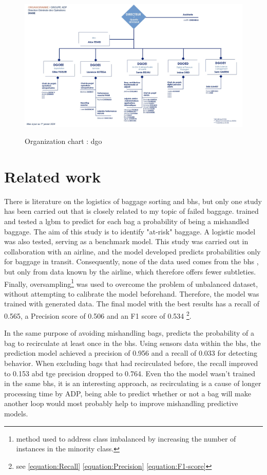 \documentclass[12pt]{article}
\begin{document}
\begin{figure}[h]
    \includegraphics[width=1\textwidth]{organigramme_DGO.jpg}\\
    \caption{Organization chart : \acrshort{dgo}}
\end{figure}
\FloatBarrier


\newpage
\section{Related work}

There is literature on the logistics of baggage sorting and \acrlong{bhs}, but only one study has been carried out that is closely related to my topic of failed baggage.
\cite{MishandledBgas} trained and tested a \acrlong{lgbm} to predict for each bag a probability of being a mishandled baggage. The aim of this study is to identify "at-risk" baggage. A logistic model was also tested, serving as a benchmark model. \hfill \break 
\noindent This study was carried out in collaboration with an airline, and the model developed predicts probabilities only for baggage in transit. Consequently, none of the data used comes from the \acrshort{bhs} , but only from data known by the airline, which therefore offers fewer subtleties. Finally, oversampling\footnote{method used to address class imbalanced by increasing the number of instances in the minority class.} was used to overcome the problem of unbalanced dataset, without attempting to calibrate the model beforehand. Therefore, the model was trained with generated data. \hfill \break
\noindent The final model with the best results has a recall of 0.565, a Precision score of 0.506 and an F1 score of 0.534 \footnote{see \autoref{equation:Recall} \autoref{equation:Precision} \autoref{equation:F1-score}}.

In the same purpose of avoiding mishandling bags, \cite{ForecastingFramework} predicts the probability of a bag to recirculate at least once in the \acrlong{bhs}. Using sensors data within the \acrshort{bhs}, the prediction model achieved a precision of 0.956 and a recall of 0.033 for detecting behavior. When excluding bags that had recirculated before, the recall improved to 0.153 abd tge precision dropped to 0.764. Even tho the model wasn't trained in the same \acrshort{bhs}, it is an interesting approach, as recirculating is a cause of longer processing time by \acrshort{ADP}, being able to predict whether or not a bag will make another loop would most probably help to improve mishandling predictive models. \hfill \break 
\end{document}
